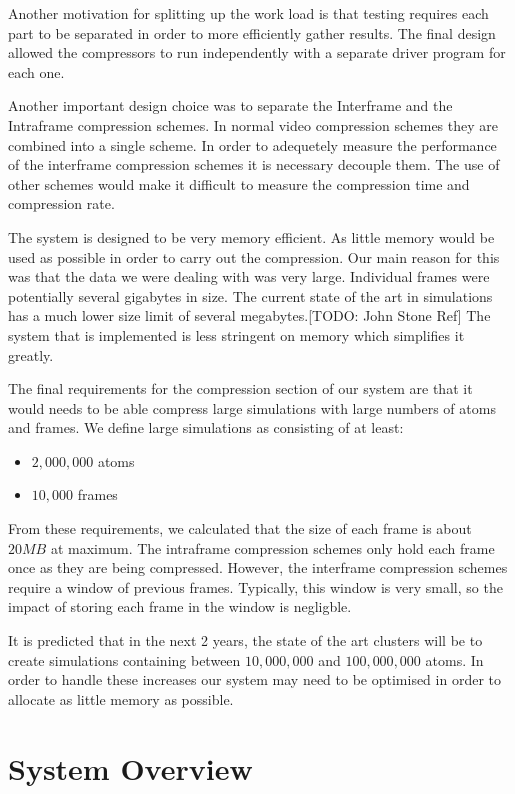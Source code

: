 \documentclass[a4paper,11pt]{report}
\begin{document}
Another motivation for splitting up the work load is that testing requires each part to be separated in order to more efficiently gather results. The final design allowed the compressors to run independently with a separate driver program for each one.

Another important design choice was to separate the Interframe and the Intraframe compression schemes. In normal video compression schemes they are combined into a single scheme. In order to adequetely measure the performance of the interframe compression schemes it is necessary decouple them. The use of other schemes would make it difficult to measure the compression time and compression rate. 
 
The system is designed to be very memory efficient. As little memory would be used as possible in order to carry out the compression. Our main reason for this was that the data we were dealing with was very large. Individual frames were potentially several gigabytes in size. The current state of the art in simulations has a much lower size limit of several megabytes.[TODO: John Stone Ref] The system that is implemented is less stringent on memory which simplifies it greatly.

The final requirements for the compression section of our system are that it would needs to be able compress large simulations with large numbers of atoms and frames. We define large simulations as consisting of at least:

\begin{itemize}
 \item $2,000,000$ atoms
 \item $10,000$ frames
\end{itemize}

From these requirements, we calculated that the size of each frame is about $20MB$ at maximum. The intraframe compression schemes only hold each frame once as they are being compressed. However, the interframe compression schemes require a window of previous frames. Typically, this window is very small, so the impact of storing each frame in the window is negligble.

It is predicted that in the next 2 years, the state of the art clusters will be to create simulations containing between $10,000,000$ and $100,000,000$ atoms. In order to handle these increases our system may need to be optimised in order to allocate as little memory as possible.


\section{System Overview}
\end{document}
